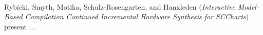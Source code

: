 


\ \hline \ %

Rybicki, Smyth, Motika,
Schulz-Rosengarten, and Hanxleden
\cite{isola-2016-rybicki}
({\em Interactive Model-Based Compilation Continued
Incremental Hardware Synthesis for SCCharts})
present ...
